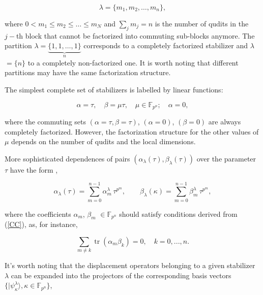 \documentclass[quantumrep,article,submit,pdftex,moreauthors]{Definitions/mdpi}
\DeclareMathOperator{\tr}{tr}
\begin{document}
\begin{equation}
  \lambda = \{m_{1}, m_{2}, \ldots, m_{n}\},
  \label{curve_part}
\end{equation}

where $0<m_{1}\leq m_{2}\leq \ldots \leq m_{N}$ and $\sum_{j}m_{j}=n$
is the number of qudits in the $j-$th block that cannot be factorized into
commuting sub-blocks anymore. The partition $\lambda =\underbrace{\{1,1,\ldots
,1\}}_{n}$ corresponds to a completely factorized stabilizer and $\lambda $
$=\{n\}$ to a completely non-factorized one. It is worth noting that different
partitions may have the same factorization structure.

The simplest complete set of stabilizers is labelled by linear functions: 

\begin{equation}
  \alpha = \tau,
  \quad \beta = \mu \tau,
  \quad \mu \in \mathbb{F}_{p^{n}};
  \quad \alpha = 0,
  \label{rays}
\end{equation}

where the commuting sets $\left(\alpha = \tau, \beta = \tau \right)$, $\left(
\alpha = 0\right)$, $\left(\beta = 0\right)$ are always completely factorized.
However, the factorization structure for the other values of $\mu$ depends on
the number of qudits and the local dimensions.

More sophisticated dependences of pairs
$\left(\alpha_{\lambda}(\tau),\beta_{\lambda }(\tau)\right)$ over the parameter
$\tau$ have the form \cite{GS2,JPA09}, 

\begin{equation}
  \alpha_{\lambda }(\tau)
  = \sum_{m=0}^{n-1} \alpha_{m}^{\lambda } \, \tau^{p^{m}},
  \qquad
  \beta_{\lambda}(\kappa)
  = \sum_{m=0}^{n-1}\beta_{m}^{\lambda} \, \tau^{p^{m}},
  \label{curve1}
\end{equation}

where the coefficients $\alpha _{m}$, $\beta _{m}$ $\in \mathbb{F}_{p^{n}}$
should satisfy conditions derived from (\ref{CC}), as, for instance, 

\begin{equation*}
  \sum_{m \neq k} \tr(\alpha_{m}\beta _{k})=0,
  \quad k = 0,...,n.
\end{equation*}

It's worth noting that the displacement operators belonging to a given
stabilizer $\lambda$ can be expanded into the projectors of the
corresponding basis vectors $\{|\psi_{\kappa }^{\lambda }\rangle, \kappa \in
\mathbb{F}_{p^{n}}\}$,
\end{document}
